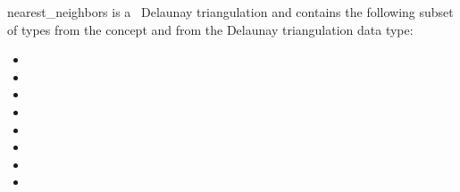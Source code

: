 \begin{ccRefFunction}{nearest_neighbors}
 is a \cgal\ Delaunay triangulation and contains the following subset of types from the concept  and from
the Delaunay triangulation data type:
\begin{itemize}
  \item {}             
  \item {}                
  \item {}               
  \item {}            
  \item {}                                   
  \item {}                       
  \item {}                           
  \item {}    
\end{itemize}  
\end{ccRefFunction}
